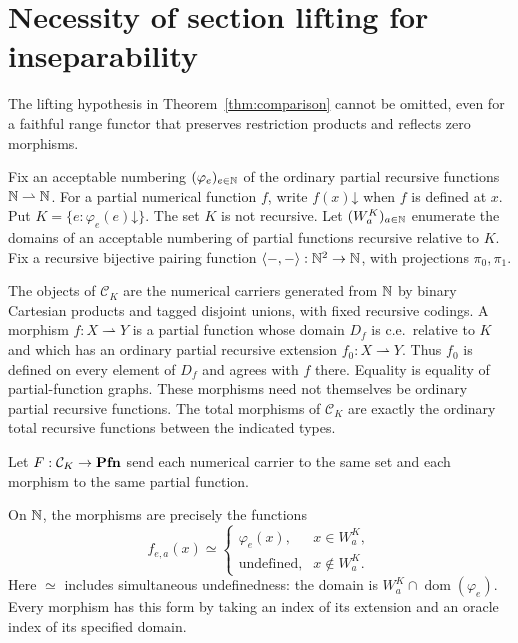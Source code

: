 \section{Necessity of section lifting for inseparability}
\label{app:lifting-counterexample}

The lifting hypothesis in Theorem~\ref{thm:comparison} cannot be
omitted, even for a faithful range functor that preserves restriction
products and reflects zero morphisms.

Fix an acceptable numbering $(\varphi_e)_{e\in\mathbb N}$ of the ordinary
partial recursive functions $\mathbb N\rightharpoonup\mathbb N$. For a partial
numerical function $f$, write $f(x)\mathord\downarrow$ when $f$ is
defined at $x$. Put $K=\{e:\varphi_e(e)\mathord\downarrow\}$.
The set $K$ is not recursive.
Let $(W_a^K)_{a\in\mathbb N}$ enumerate the domains of an acceptable
numbering of partial functions recursive relative to $K$.
Fix a recursive bijective pairing function
$\langle-,-\rangle:\mathbb N^2\to\mathbb N$, with projections $\pi_0,\pi_1$.

The objects of $\mathcal C_K$ are the numerical carriers generated
from $\mathbb N$ by binary Cartesian products and tagged disjoint unions,
with fixed recursive codings. A morphism $f:X\rightharpoonup Y$ is a partial function whose
domain $D_f$ is c.e.\ relative to $K$ and which has an ordinary partial
recursive extension $f_0:X\rightharpoonup Y$. Thus $f_0$ is defined
on every element of $D_f$ and agrees with $f$ there. Equality is equality
of partial-function graphs. These morphisms need not themselves be ordinary
partial recursive functions. The total morphisms of $\mathcal C_K$ are exactly
the ordinary total recursive functions between the indicated types.

Let $F:\mathcal C_K\to\mathbf{Pfn}$ send each numerical carrier to the same
set and each morphism to the same partial function.

On $\mathbb N$, the morphisms are precisely the functions
\[
 f_{e,a}(x)\simeq
 \begin{cases}
  \varphi_e(x),&x\in W_a^K,\\
  \text{undefined},&x\notin W_a^K.
 \end{cases}
\]
Here $\simeq$ includes simultaneous undefinedness: the domain
is $W_a^K\cap\operatorname{dom}(\varphi_e)$. Every morphism has this
form by taking an index of its extension and an oracle index of its
specified domain.

